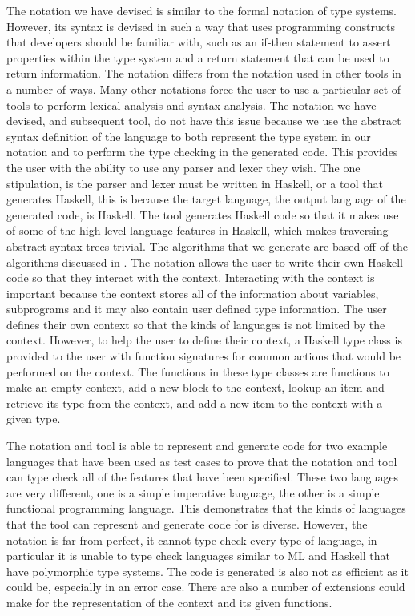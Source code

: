 \documentclass{UoYCSproject}
\begin{document}
\begin{summary}
    The notation we have devised is similar to the formal notation of type systems.
    However, its syntax is devised in such a way that uses programming constructs that developers should be familiar with, such as an if-then statement to assert properties within the type system and a return statement that can be used to return information.
    The notation differs from the notation used in other tools in a number of ways.
    Many other notations force the user to use a particular set of tools to perform lexical analysis and syntax analysis.
    The notation we have devised, and subsequent tool, do not have this issue because we use the abstract syntax definition of the language to both represent the type system in our notation and to perform the type checking in the generated code.
    This provides the user with the ability to use any parser and lexer they wish.
    The one stipulation, is the parser and lexer must be written in Haskell, or a tool that generates Haskell, this is because the target language, the output language of the generated code, is Haskell.
    The tool generates Haskell code so that it makes use of some of the high level language features in Haskell, which makes traversing abstract syntax trees trivial.
    The algorithms that we generate are based off of the algorithms discussed in \textcite{ranta2012implementing}.
    The notation allows the user to write their own Haskell code so that they interact with the context.
    Interacting with the context is important because the context stores all of the information about variables, subprograms and it may also contain user defined type information.
    The user defines their own context so that the kinds of languages is not limited by the context.
    However, to help the user to define their context, a Haskell type class is provided to the user with function signatures for common actions that would be performed on the context.
    The functions in these type classes are functions to make an empty context, add a new block to the context, lookup an item and retrieve its type from the context, and add a new item to the context with a given type.

    The notation and tool is able to represent and generate code for two example languages that have been used as test cases to prove that the notation and tool can type check all of the features that have been specified.
    These two languages are very different, one is a simple imperative language, the other is a simple functional programming language.
    This demonstrates that the kinds of languages that the tool can represent and generate code for is diverse.
    However, the notation is far from perfect, it cannot type check every type of language, in particular it is unable to type check languages similar to ML and Haskell that have polymorphic type systems.
    The code is generated is also not as efficient as it could be, especially in an error case.
    There are also a number of extensions could make for the representation of the context and its given functions.


\end{summary}
\end{document}
